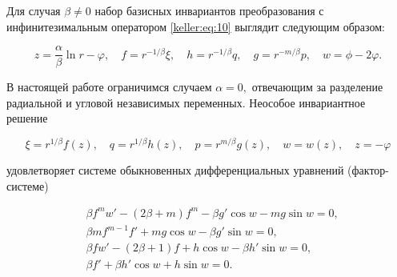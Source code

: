 Для случая $\beta \ne 0$ набор базисных инвариантов преобразования с инфинитезимальным оператором \eqref{keller:eq:10} выглядит следующим образом:

\begin{equation}\label{keller:eq:11}

z = \frac{\alpha}{\beta}\ln r-\varphi ,\quad  

f = r^{-{1}/{\beta}}\xi ,\quad 

h = r^{-{1}/{\beta}}q ,\quad  

g = r^{-{m}/{\beta}}p ,\quad  

w = \phi - 2\varphi.

\end{equation} 



В настоящей работе ограничимся случаем $\alpha = 0,$ отвечающим за разделение радиальной и угловой независимых переменных. Неособое инвариантное решение 

\begin{equation}\label{keller:eq:12}

\xi=r^{{1}/{\beta}}f(z),\quad 

q=r^{{1}/{\beta}}h(z),\quad  

p=r^{{m}/{\beta}}g(z),\quad  

w=w(z),\quad  

z = -\varphi

\end{equation}

удовлетворяет системе обыкновенных дифференциальных уравнений (фактор-системе)

\begin{equation}\label{keller:eq:13}

\begin{split}

& \beta f^m w' - (2\beta + m)f^m - \beta g' \cos w - mg \sin w = 0,\\

&\beta m f^{m-1}f' + mg\cos w - \beta g' \sin w = 0,\\

& \beta f w' - (2\beta + 1)f +  h \cos w - \beta h' \sin w = 0,\\

&\beta f'  + \beta h' \cos w +  h \sin w = 0.

\end{split}

\end{equation}



